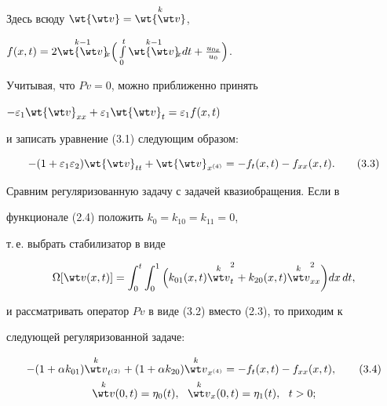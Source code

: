 \begin{pf}
\begin{equation}
\end{equation} 


Здесь всюду $\wt{\wt v}=\up{k}{\wt{\wt v}}$, 


$f(x,t)=2\up{k-1}{\wt{\wt v}}_{\!\!x}\Big(\int\limits^t_0 


\up{k-1}{\wt{\wt v}}_{\!\!x}dt+\frac{u_{0x}}{u_0}\Big)$. 


Учитывая, что $P v=0$, можно приближенно принять 


$-\varepsilon_1\wt{\wt v}_{xx}+\varepsilon_1\wt{\wt v}_t 


=\varepsilon_1f(x,t)$ 


и записать уравнение (3.1) следующим образом: 


\begin{equation} 


-(1+\varepsilon_1\varepsilon_2)\wt{\wt v}_{tt}+ 


\wt{\wt v}_{x^{(4)}}=-f_t(x,t)-f_{xx}(x,t).\tag{3.3} 


\end{equation} 


 


Сравним регуляризованную задачу с задачей квазиобращения. Если в 


функционале (2.4) положить $k_0=k_{10}=k_{11}=0$, 


т.\,е. выбрать стабилизатор в виде 


$$ 


\Omega[\wt v(x,t)]=\int^t_0\int^1_0\Big(k_{01}(x,t) 


{\up{k}{\wt v}}^2_t+k_{20}(x,t) 


{\up{k}{\wt v}}^2_{xx}\bigg)dx\,dt, 


$$ 


и рассматривать оператор $P v$ в виде (3.2) вместо (2.3), то приходим к 


следующей регуляризованной задаче: 


\begin{gather} 


-(1+\alpha k_{01})\up{k}{\wt v}_{t^{(2)}} 


+(1+\alpha k_{20})\up{k}{\wt v}_{x^{(4)}}= 


-f_t(x,t)-f_{xx}(x,t),\tag{3.4} \\ 


% 


\up{k}{\wt v}(0,t)=\eta_0(t),\ \ \up{k}{\wt v}_x(0,t)= 


\eta_1(t),\ \ t>0;\notag \\ 



\end{gather}
\end{pf}
